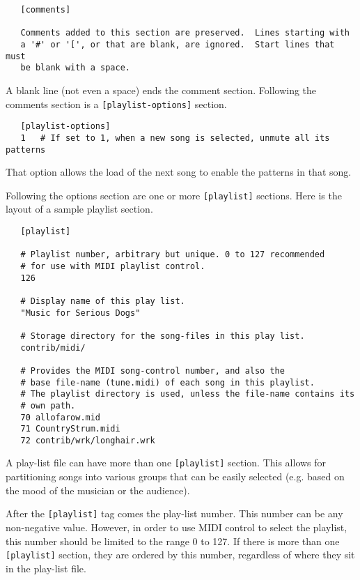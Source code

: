    \begin{verbatim}
   [comments]

   Comments added to this section are preserved.  Lines starting with
   a '#' or '[', or that are blank, are ignored.  Start lines that must
   be blank with a space.
   \end{verbatim}

   A blank line (not even a space) ends the comment section.
   Following the comments section is a \texttt{[playlist-options]} section.

   \begin{verbatim}
   [playlist-options]
   1   # If set to 1, when a new song is selected, unmute all its patterns
   \end{verbatim}

   That option allows the load of the next song to enable the patterns in that
   song.

   Following the options section are one or more \texttt{[playlist]} sections.
   Here is the layout of a sample playlist section.

   \begin{verbatim}
   [playlist]

   # Playlist number, arbitrary but unique. 0 to 127 recommended
   # for use with MIDI playlist control.
   126

   # Display name of this play list.
   "Music for Serious Dogs"

   # Storage directory for the song-files in this play list.
   contrib/midi/

   # Provides the MIDI song-control number, and also the
   # base file-name (tune.midi) of each song in this playlist.
   # The playlist directory is used, unless the file-name contains its
   # own path.
   70 allofarow.mid
   71 CountryStrum.midi
   72 contrib/wrk/longhair.wrk
   \end{verbatim}

   A play-list file can have more than one \texttt{[playlist]} section.  This
   allows for partitioning songs into various groups that can be easily
   selected (e.g. based on the mood of the musician or the audience).

   After the \texttt{[playlist]} tag comes the play-list number.
   This number can be any non-negative value.
   However, in order to use MIDI control to select the playlist, this number
   should be limited to the range 0 to 127.
   If there is more than one \texttt{[playlist]} section, they are ordered by
   this number, regardless of where they sit in the play-list file.

